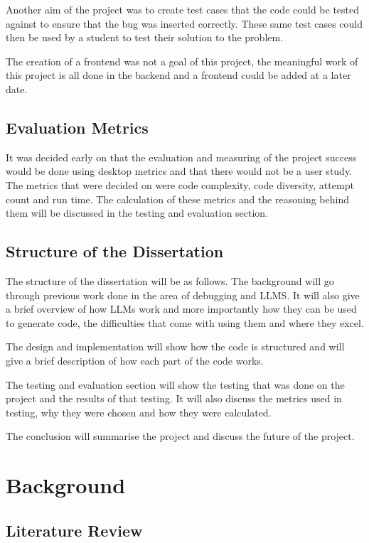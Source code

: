 \documentclass[12pt]{extarticle}
\begin{document}
Another aim of the project was to create test cases that the code could be tested against to ensure that the bug was inserted correctly. These same test cases could then be used by a student to test their solution to the problem.

The creation of a frontend was not a goal of this project, the meaningful work of this project is all done in the backend and a frontend could be added at a later date.

\subsection{Evaluation Metrics}

It was decided early on that the evaluation and measuring of the project success would be done using desktop metrics and that there would not be a user study. The metrics that were decided on were code complexity, code diversity, attempt count and run time. The calculation of these metrics and the reasoning behind them will be discussed in the testing and evaluation section.

\subsection{Structure of the Dissertation}

The structure of the dissertation will be as follows. The background will go through previous work done in the area of debugging and LLMS. It will also give a brief overview of how LLMs work and more importantly how they can be used to generate code, the difficulties that come with using them and where they excel. 

The design and implementation will show how the code is structured and will give a brief description of how each part of the code works.

The testing and evaluation section will show the testing that was done on the project and the results of that testing. It will also discuss the metrics used in testing, why they were chosen and how they were calculated.

The conclusion will summarise the project and discuss the future of the project.
\newpage
\section{Background}

\subsection{Literature Review}
\end{document}
